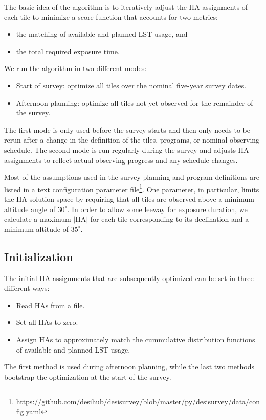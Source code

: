 \documentclass[12pt]{article}
\begin{document}
The basic idea of the algorithm is to iteratively adjust the HA assignments of each tile to minimize a score function that accounts for two metrics:
\begin{itemize}
    \item the matching of available and planned LST usage, and
    \item the total required exposure time.
\end{itemize}
We run the algorithm in two different modes:
\begin{itemize}
    \item Start of survey: optimize all tiles over the nominal five-year survey dates.
    \item Afternoon planning: optimize all tiles not yet observed for the remainder of the survey.
\end{itemize}
The first mode is only used before the survey starts and then only needs to be rerun after a change in the definition of the tiles, programs, or nominal observing schedule. The second mode is run regularly during the survey and adjusts HA assignments to reflect actual observing progress and any schedule changes.

Most of the assumptions used in the survey planning and program definitions are listed in a text configuration parameter file\footnote{\url{https://github.com/desihub/desisurvey/blob/master/py/desisurvey/data/config.yaml}}. One parameter, in particular, limits the HA solution space by requiring that all tiles are observed above a minimum altitude angle of $30^\circ$.  In order to allow some leeway for exposure duration, we calculate a maximum $|\text{HA}|$ for each tile corresponding to its declination and a minimum altitude of $35^\circ$.

\subsection{Initialization}

The initial HA assignments that are subsequently optimized can be set in three different ways:
\begin{itemize}
    \item Read HAs from a file.
    \item Set all HAs to zero.
    \item Assign HAs to approximately match the cummulative distribution functions of available and planned LST usage.
\end{itemize}
The first method is used during afternoon planning, while the last two methods bootstrap the optimization at the start of the survey.
\end{document}
